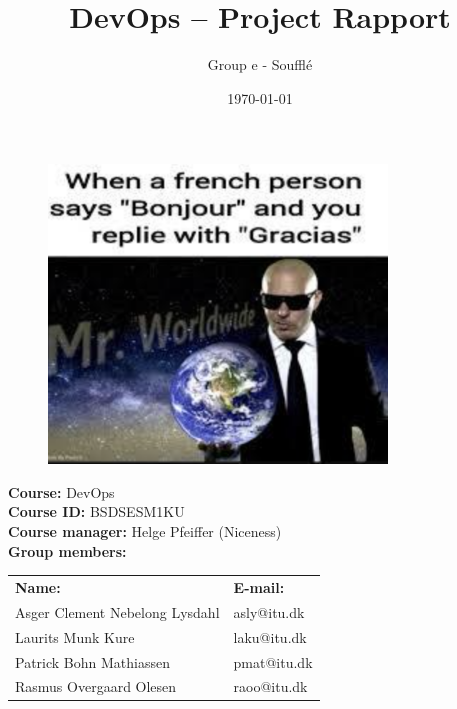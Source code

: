 \title{\textbf{DevOps – Project Rapport}}
\author{Group e - Soufflé}

\date{\today}

\maketitle

\begin{figure}[H]
    \centering
    \includegraphics[width = 9.0cm]{Images/Screenshot 2023-05-09 at 11.25.08.png}
\end{figure}

\begin{center}
    \vspace{1cm}
    \textbf{Course:} DevOps \\
    \textbf{Course ID:} BSDSESM1KU \\
    \textbf{Course manager:} Helge Pfeiffer (Niceness)\\
    \vspace{1cm}
    \textbf{Group members: }
\end{center}

\begin{center}
\begin{tabular}{ m{20em}  m{10em} }
    \textbf{Name:} & \textbf{E-mail:}  \\
    Asger Clement Nebelong Lysdahl & asly@itu.dk \\
    Laurits Munk Kure & laku@itu.dk \\
    Patrick Bohn Mathiassen & pmat@itu.dk \\
    Rasmus Overgaard Olesen & raoo@itu.dk \\
\end{tabular}

\end{center}